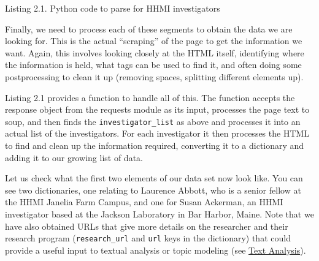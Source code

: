 \documentclass[]{krantz}
\begin{document}
Listing 2.1. Python code to parse for HHMI investigators

\pagebreak
Finally, we need to process each of these segments to obtain the data we
are looking for. This is the actual ``scraping'' of the page to get the
information we want. Again, this involves looking closely at the HTML
itself, identifying where the information is held, what tags can be used
to find it, and often doing some postprocessing to clean it up (removing
spaces, splitting different elements up).

Listing 2.1 provides a function to handle all of this. The function
accepts the response object from the requests module as its input,
processes the page text to soup, and then finds the
\texttt{investigator\_list} as above and processes it into an actual
list of the investigators. For each investigator it then processes the
HTML to find and clean up the information required, converting it to a
dictionary and adding it to our growing list of data.

Let us check what the first two elements of our data set now look like.
You can see two dictionaries, one relating to Laurence Abbott, who is a
senior fellow at the HHMI Janelia Farm Campus, and one for Susan
Ackerman, an HHMI investigator based at the Jackson Laboratory in Bar
Harbor, Maine. Note that we have also obtained URLs that give more
details on the researcher and their research program
(\texttt{research\_url} and \texttt{url} keys in the dictionary) that
could provide a useful input to textual analysis or topic modeling (see
\protect\hyperlink{chap:text}{Text Analysis}).
\end{document}
